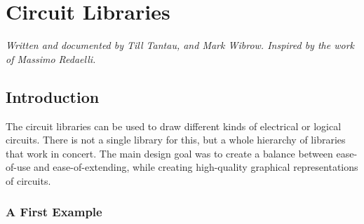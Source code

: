 %
%
%


\section[library-circuits]{Circuit Libraries}
\label{section-library-circuits}

\emph{Written and documented by Till Tantau, and Mark Wibrow. Inspired
by the work of Massimo Redaelli.}


\subsection{Introduction}

The circuit libraries can be used to draw different kinds of electrical or
logical circuits. There is not a single library for this, but a whole hierarchy
of libraries that work in concert. The main design goal was to create a balance
between ease-of-use and ease-of-extending, while creating high-quality
graphical representations of circuits.
%
\begin{codeexample}
\end{codeexample}


\subsubsection{A First Example}

